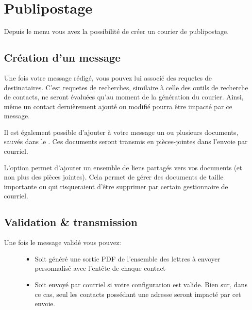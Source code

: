 \documentclass[a4paper,10pt,oneside,french]{sphinxmanual}
\begin{document}
\section{Publipostage}
\label{\detokenize{mailing/mailing:publipostage}}\label{\detokenize{mailing/mailing::doc}}
Depuis le menu  vous avez la possibilité de créer un courier de publipostage.


\subsection{Création d’un message}
\label{\detokenize{mailing/mailing:creation-d-un-message}}
Une fois votre message rédigé, vous pouvez lui associé des requetes de destinataires.
C’est requetes de recherches, similaire à celle des outils de recherche de contacts, ne seront évaluées qu’au moment de la génération du courier.
Ainsi, même un contact dernièrement ajouté ou modifié pourra être impacté par ce message.

Il est également possible d’ajouter à votre message un ou plusieurs documents, sauvés dans le .
Ces documents seront transmis en pièces-jointes dans l’envoie par courriel.

L’option  permet d’ajouter un ensemble de liens partagés vers vos documents (et non plus des pièces jointes).
Cela permet de gérer des documents de taille importante ou qui risqueraient d’être supprimer par certain gestionnaire de courriel.

\noindent{}


\subsection{Validation \& transmission}
\label{\detokenize{mailing/mailing:validation-transmission}}\begin{description}
\item[{Une fois le message validé vous pouvez:}] \leavevmode\begin{itemize}
\item {} 
Soit généré une sortie PDF de l’ensemble des lettres à envoyer personnalisé avec l’entête de chaque contact

\item {} 
Soit envoyé par courriel si votre configuration est valide. Bien sur, dans ce cas, seul les contacts possédant une adresse seront impacté par cet envoie.

\end{itemize}

\end{description}
\end{document}
